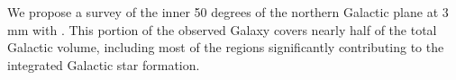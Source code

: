 \documentclass[11pt,preprint]{aastex_nofoot}
\begin{document}
% 
% 



We propose a survey of the inner 50 degrees of the northern
Galactic plane at 3 mm with \MUSTANG.  This portion of the observed Galaxy covers
nearly half of the total Galactic volume, including most of the regions significantly
contributing to the integrated Galactic star formation.
\end{document}
